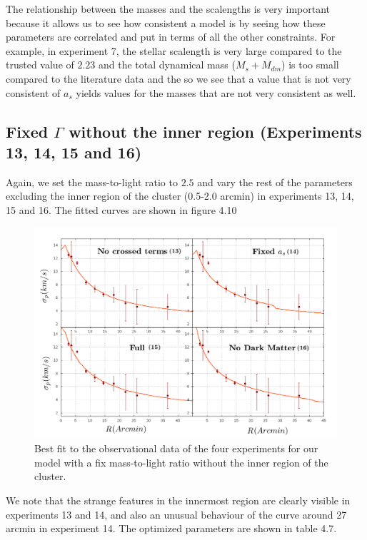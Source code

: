 The relationship between the masses and the scalengths is very important because it allows us to see how consistent a model is by seeing how these parameters are correlated and put in terms of all the other constraints. For example, in experiment 7, the stellar scalength is very large compared to the trusted value of $2.23$ and the total dynamical mass ($M_{s}+M_{dm}$) is too small compared to the literature data and the  so we see that a value that is not very consistent of $a_s$ yields values for the masses that are not very consistent as well.  

\subsection{Fixed $\Gamma$ without the inner region (Experiments 13, 14, 15 and 16)}

Again, we set the mass-to-light ratio to $2.5$ and vary the rest of the parameters excluding the inner region of the cluster (0.5-2.0 arcmin) in experiments 13, 14, 15 and 16. The fitted curves are shown in figure 4.10

\begin{figure}[H]
\centering
\includegraphics[width=15cm]{images/fix_gamma_refinado_10.png}
\caption[Best fit of our model with a fix mass-to-light ratio without the inner region]{Best fit to the observational data of the four experiments for our model with a fix mass-to-light ratio without the inner region of the cluster.}
\end{figure}

We note that the strange features in the innermost region are clearly visible in experiments 13 and 14, and also an unusual behaviour of the curve around 27 arcmin in experiment 14. The optimized parameters are shown in table 4.7.

